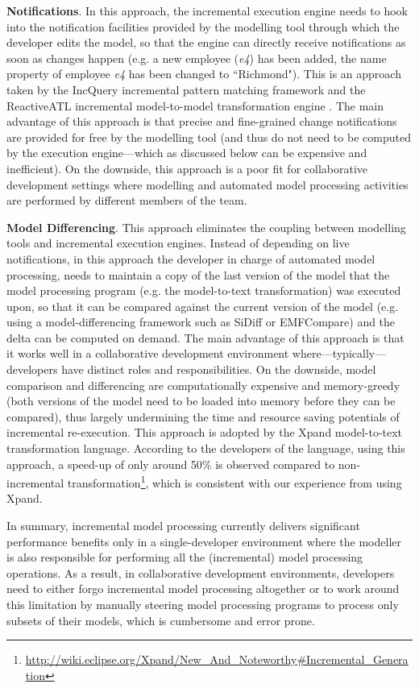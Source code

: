 \documentclass{llncs}
\begin{document}
\textbf{Notifications}. In this approach, the incremental execution engine needs to hook into the notification facilities provided by the modelling tool through which the developer edits the model, so that the engine can directly receive notifications as soon as changes happen (e.g. a new employee (\emph{e4}) has been added, the name property of employee \emph{e4} has been changed to ``Richmond"). This is an approach taken by the IncQuery incremental pattern matching framework \cite{rath2012derived} and the ReactiveATL incremental model-to-model transformation engine \cite{ogunyomi2015property}. The main advantage of this approach is that precise and fine-grained change notifications are provided for free by the modelling tool (and thus do not need to be computed by the execution engine---which as discussed below can be expensive and inefficient). On the downside, this approach is a poor fit for collaborative development settings where modelling and automated model processing activities are performed by different members of the team.

\textbf{Model Differencing}. This approach eliminates the coupling between modelling tools and incremental execution engines. Instead of depending on live notifications, in this approach the developer in charge of automated model processing, needs to maintain a copy of the last version of the model that the model processing program (e.g. the model-to-text transformation) was executed upon, so that it can be compared against the current version of the model (e.g. using a model-differencing framework such as SiDiff or EMFCompare) and the delta can be computed on demand. The main advantage of this approach is that it works well in a collaborative development environment where---typically---developers have distinct roles and responsibilities. On the downside, model comparison and differencing are computationally expensive and memory-greedy (both versions of the model need to be loaded into memory before they can be compared), thus largely undermining the time and resource saving potentials of incremental re-execution. This approach is adopted by the Xpand model-to-text transformation language. According to the developers of the language, using this approach, a speed-up of only around 50\% is observed compared to non-incremental transformation\footnote{\url{http://wiki.eclipse.org/Xpand/New_And_Noteworthy\#Incremental_Generation}}, which is consistent with our experience from using Xpand.

In summary, incremental model processing currently delivers significant performance benefits only in a single-developer environment where the modeller is also responsible for performing all the (incremental) model processing operations. As a result, in collaborative development environments, developers need to either forgo incremental model processing altogether or to work around this limitation by manually steering model processing programs to process only subsets of their models, which is cumbersome and error prone.
\end{document}
